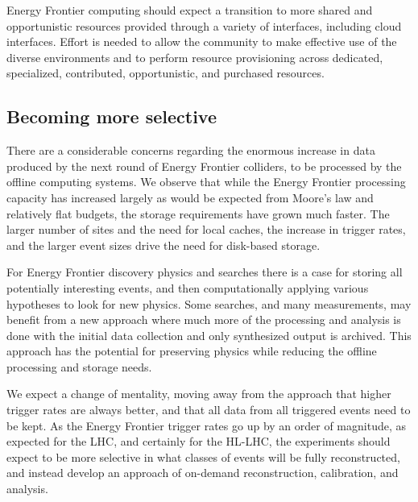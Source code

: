 Energy Frontier computing should expect a transition to more shared and opportunistic
resources provided through a variety of interfaces, including cloud
interfaces.   Effort is needed to allow the community to make effective use of
the diverse environments and to perform resource provisioning across
dedicated, specialized, contributed, opportunistic, and purchased resources.

\subsection{Becoming more selective}
There are a considerable concerns regarding the enormous increase in data
produced by the next round of Energy Frontier colliders,   to be processed by the offline
computing systems.  We observe that while the Energy Frontier processing capacity has
increased largely as would be expected from Moore's law and relatively
flat budgets, the storage requirements have grown much faster.  The larger
number of sites and the need for local caches, the increase in trigger rates,
and the larger event sizes drive the need for disk-based storage.

For Energy Frontier discovery physics and searches there is a case for storing all
potentially interesting events, and then computationally  applying various
hypotheses to look for new physics.  
Some searches, and many measurements, may benefit from a
new approach where much more of the processing and analysis is done with the
initial data collection and only synthesized output is archived.
This approach has the
potential for preserving physics while reducing the offline processing and
storage needs.  

We expect a change of mentality, moving away from the approach that higher
trigger rates are always better, and that all data from  all triggered events
need to be kept.   As the Energy Frontier trigger rates go up by an order of magnitude,  as
expected for the LHC, and certainly for the HL-LHC,  the experiments
should expect to be more selective in what classes of events will be fully
reconstructed,  and instead develop an approach of on-demand reconstruction,
calibration, and analysis.

